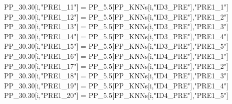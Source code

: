 \documentclass[12pt,twoside]{reedthesis}
\newenvironment{Shaded}{\begin{snugshade}}{\end{snugshade}}
\newcommand{\FloatTok}[1]{\textcolor[rgb]{0.00,0.00,0.81}{#1}}
\newcommand{\NormalTok}[1]{#1}
\newcommand{\StringTok}[1]{\textcolor[rgb]{0.31,0.60,0.02}{#1}}
\begin{document}
\begin{Shaded}
\begin{Highlighting}[]
{\NormalTok{  PP_}\FloatTok{30.30}\NormalTok{[i,}\StringTok{"PRE1_11"}\NormalTok{] =}\StringTok{ }\NormalTok{PP_}\FloatTok{5.5}\NormalTok{[PP_KNNs[i,}\StringTok{"ID3_PRE"}\NormalTok{],}\StringTok{"PRE1_1"}\NormalTok{]}
\NormalTok{  PP_}\FloatTok{30.30}\NormalTok{[i,}\StringTok{"PRE1_12"}\NormalTok{] =}\StringTok{ }\NormalTok{PP_}\FloatTok{5.5}\NormalTok{[PP_KNNs[i,}\StringTok{"ID3_PRE"}\NormalTok{],}\StringTok{"PRE1_2"}\NormalTok{]}
\NormalTok{  PP_}\FloatTok{30.30}\NormalTok{[i,}\StringTok{"PRE1_13"}\NormalTok{] =}\StringTok{ }\NormalTok{PP_}\FloatTok{5.5}\NormalTok{[PP_KNNs[i,}\StringTok{"ID3_PRE"}\NormalTok{],}\StringTok{"PRE1_3"}\NormalTok{]}
\NormalTok{  PP_}\FloatTok{30.30}\NormalTok{[i,}\StringTok{"PRE1_14"}\NormalTok{] =}\StringTok{ }\NormalTok{PP_}\FloatTok{5.5}\NormalTok{[PP_KNNs[i,}\StringTok{"ID3_PRE"}\NormalTok{],}\StringTok{"PRE1_4"}\NormalTok{]}
\NormalTok{  PP_}\FloatTok{30.30}\NormalTok{[i,}\StringTok{"PRE1_15"}\NormalTok{] =}\StringTok{ }\NormalTok{PP_}\FloatTok{5.5}\NormalTok{[PP_KNNs[i,}\StringTok{"ID3_PRE"}\NormalTok{],}\StringTok{"PRE1_5"}\NormalTok{]}
\NormalTok{  PP_}\FloatTok{30.30}\NormalTok{[i,}\StringTok{"PRE1_16"}\NormalTok{] =}\StringTok{ }\NormalTok{PP_}\FloatTok{5.5}\NormalTok{[PP_KNNs[i,}\StringTok{"ID4_PRE"}\NormalTok{],}\StringTok{"PRE1_1"}\NormalTok{]}
\NormalTok{  PP_}\FloatTok{30.30}\NormalTok{[i,}\StringTok{"PRE1_17"}\NormalTok{] =}\StringTok{ }\NormalTok{PP_}\FloatTok{5.5}\NormalTok{[PP_KNNs[i,}\StringTok{"ID4_PRE"}\NormalTok{],}\StringTok{"PRE1_2"}\NormalTok{]}
\NormalTok{  PP_}\FloatTok{30.30}\NormalTok{[i,}\StringTok{"PRE1_18"}\NormalTok{] =}\StringTok{ }\NormalTok{PP_}\FloatTok{5.5}\NormalTok{[PP_KNNs[i,}\StringTok{"ID4_PRE"}\NormalTok{],}\StringTok{"PRE1_3"}\NormalTok{]}
\NormalTok{  PP_}\FloatTok{30.30}\NormalTok{[i,}\StringTok{"PRE1_19"}\NormalTok{] =}\StringTok{ }\NormalTok{PP_}\FloatTok{5.5}\NormalTok{[PP_KNNs[i,}\StringTok{"ID4_PRE"}\NormalTok{],}\StringTok{"PRE1_4"}\NormalTok{]}
\NormalTok{  PP_}\FloatTok{30.30}\NormalTok{[i,}\StringTok{"PRE1_20"}\NormalTok{] =}\StringTok{ }\NormalTok{PP_}\FloatTok{5.5}\NormalTok{[PP_KNNs[i,}\StringTok{"ID4_PRE"}\NormalTok{],}\StringTok{"PRE1_5"}\NormalTok{]}

}
\end{Highlighting}
\end{Shaded}
\end{document}
